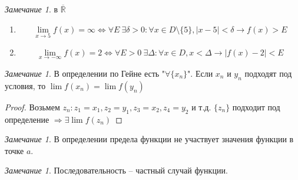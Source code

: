 \documentclass[12pt]{article}
\newenvironment{MyList}[1][4pt]{
  \begin{enumerate}[1.]
  \setlength{\parskip}{0pt}
  \setlength{\itemsep}{#1}
}{       
  \end{enumerate}
}
\def\R{\mathbb{R}}       %
\def\SO{\Rightarrow}     %
\def\EQ{\Leftrightarrow} %
\theoremstyle{definition} %
\theoremstyle{plain} %
\theoremstyle{remark} %
\newtheorem{Rem}[Thm]{Замечание} %
\begin{document}
\begin{Rem}
    в $\overline{\R}$ 
    \begin{MyList}
        \item \[\lim_{x \to 5} f(x) = \infty \EQ \forall E \ \exists \delta > 0 : \forall x \in D \setminus \{5\}, |x - 5| < \delta \to f(x) > E\]
        \item \[\lim_{x \to -\infty} f(x) = 2 \EQ \forall E > 0 \ \exists \Delta : \forall x \in D, x < \Delta \to |f(x) - 2| < E\]
    \end{MyList}
\end{Rem}

\begin{Rem}
    В определении по Гейне есть "$\forall \{x_n\}$". Если $x_n$ и $y_n$ подходят под условия, то $\lim f(x_n) = \lim f(y_n)$ 
\end{Rem}

\begin{proof}
    Возьмем $z_n: z_1 = x_1, z_2 = y_1, z_3 = x_2, z_4 = y_2$ и т.д. $\{z_n\}$ подходит под определение $\SO \exists \lim f(z_n)$ 
\end{proof}

\begin{Rem}
    В определении предела функции не участвует значения функции в точке $a$.
\end{Rem}

\begin{Rem}
    Последовательность -- частный случай функции.
\end{Rem}
\end{document}
